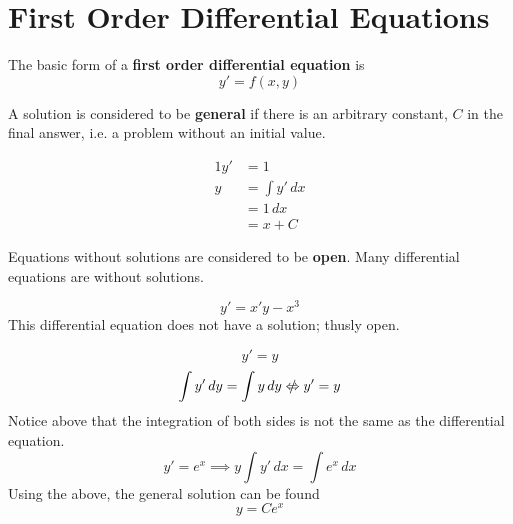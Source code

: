 \documentclass[twoside]{report}
\begin{document}
    \maketitle
    \chapter{First Order Differential Equations}
    \begin{definition}
        The basic form of a \textbf{first order differential equation} is
        \[
            y' = f(x, y)
        \]
    \end{definition}
    \begin{definition}
        A solution is considered to be \textbf{general} if there is an arbitrary constant, $C$ in the final answer, i.e. a problem without an initial value.
    \end{definition}
    \begin{example}
        \begin{alignat}{1}
            y' &= 1\\
            y &= \int y'\,dx\\
            &= 1\,dx\\
            &= x + C
        \end{alignat}
    \end{example}
    \np
    \begin{definition}
        Equations without solutions are considered to be \textbf{open}. Many differential equations are without solutions.
    \end{definition}
    \begin{example}
        \begin{equation}
            y' = x'y - x^{3}
        \end{equation}
        This differential equation does not have a solution; thusly open.
    \end{example}
    \begin{example}
        \begin{equation}
            y' = y
        \end{equation}
        \begin{equation}
            \int y'\,dy = \int y\,dy \notLeftrightarrow y' = y
        \end{equation}
        Notice above that the integration of both sides is not the same as the differential equation.
        \begin{equation}
            y' = e^x \implies y \int y'\,dx = \int e^x\,dx
        \end{equation}
        Using the above, the general solution can be found
        \begin{equation}
            y = Ce^{x}
        \end{equation}
    \end{example}
\end{document}
